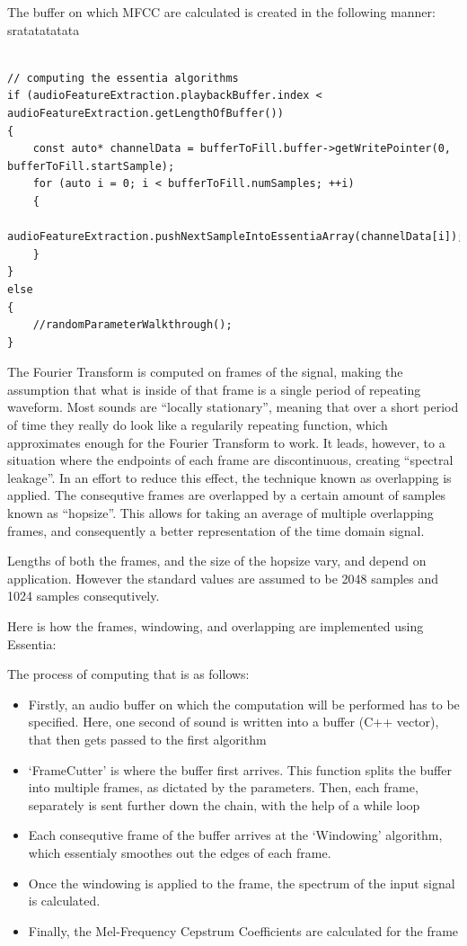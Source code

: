 The buffer on which MFCC are calculated is created in the following manner:
sratatatatata
\begin{lstlisting}

// computing the essentia algorithms
if (audioFeatureExtraction.playbackBuffer.index < audioFeatureExtraction.getLengthOfBuffer())
{
    const auto* channelData = bufferToFill.buffer->getWritePointer(0, bufferToFill.startSample);
    for (auto i = 0; i < bufferToFill.numSamples; ++i)
    {
        audioFeatureExtraction.pushNextSampleIntoEssentiaArray(channelData[i]);
    }
}
else
{
    //randomParameterWalkthrough();
}

\end{lstlisting}

The Fourier Transform is computed on frames of the signal, making
the assumption that what is inside of that frame is a single period of
repeating waveform. Most sounds are ``locally stationary'', meaning
that over a short period of time they really do look like a regularily
repeating function, which approximates enough for the Fourier
Transform to work. It leads, however, to a situation where the
endpoints of each frame are discontinuous, creating ``spectral
leakage''. In an effort to reduce this effect, the technique known as
overlapping is applied. The consequtive frames are overlapped by a
certain amount of samples known as ``hopsize''. This allows for taking
an average of multiple overlapping frames, and consequently a better
representation of the time domain signal.

Lengths of both the frames, and the size of the hopsize vary, and
depend on application. However the standard values are assumed to be
2048 samples and 1024 samples consequtively.

Here is how the frames, windowing, and overlapping are implemented
using Essentia:


The process of computing that is as follows:

\begin{itemize}
\item Firstly, an audio buffer on which the computation will be
  performed has to be specified. Here, one second of sound is written
  into a buffer (C++ vector), that then gets passed to the first algorithm
\item `FrameCutter' is where the buffer first arrives. This function
  splits the buffer into multiple frames, as dictated by the
  parameters. Then, each frame, separately is sent further down the
  chain, with the help of a while loop
\item Each consequtive frame of the buffer arrives at the `Windowing'
  algorithm, which essentialy smoothes out the edges of each frame.
\item Once the windowing is applied to the frame, the spectrum of the
  input signal is calculated.
\item Finally, the Mel-Frequency Cepstrum Coefficients are calculated
  for the frame
\end{itemize}

